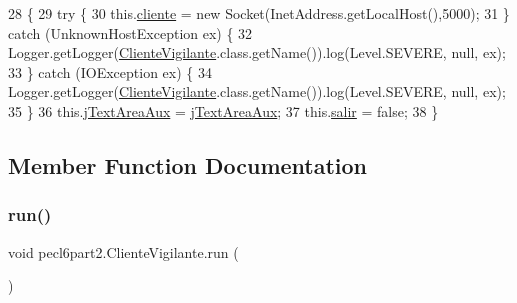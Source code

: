 \begin{DoxyCode}
28     \{
29         \textcolor{keywordflow}{try} \{
30             this.\mbox{\hyperlink{classpecl6part2_1_1_cliente_vigilante_a86ec03929e1c3324e42f83c4b49d0273}{cliente}} = \textcolor{keyword}{new} Socket(InetAddress.getLocalHost(),5000);
31         \} \textcolor{keywordflow}{catch} (UnknownHostException ex) \{
32             Logger.getLogger(\mbox{\hyperlink{classpecl6part2_1_1_cliente_vigilante_a2ba9f0dd667c95448bbbf3fe0cfccfcf}{ClienteVigilante}}.class.getName()).log(Level.SEVERE, null, ex);
33         \} \textcolor{keywordflow}{catch} (IOException ex) \{
34             Logger.getLogger(\mbox{\hyperlink{classpecl6part2_1_1_cliente_vigilante_a2ba9f0dd667c95448bbbf3fe0cfccfcf}{ClienteVigilante}}.class.getName()).log(Level.SEVERE, null, ex);
35         \}
36         this.\mbox{\hyperlink{classpecl6part2_1_1_cliente_vigilante_a1a8bbb57af057f85a3d16d5371bd747f}{jTextAreaAux}} = \mbox{\hyperlink{classpecl6part2_1_1_cliente_vigilante_a1a8bbb57af057f85a3d16d5371bd747f}{jTextAreaAux}};
37         this.\mbox{\hyperlink{classpecl6part2_1_1_cliente_vigilante_a79eb08097bb28efa5c33a168babe47e8}{salir}} = \textcolor{keyword}{false};
38     \}
\end{DoxyCode}


\subsection{Member Function Documentation}
\mbox{\label{classpecl6part2_1_1_cliente_vigilante_a38c9e8737a78b3a8cd85f85c0adfc08e}} 
\subsubsection{\texorpdfstring{run()}{run()}}
{\footnotesize\ttfamily void pecl6part2.\+Cliente\+Vigilante.\+run (\begin{DoxyParamCaption}{ }\end{DoxyParamCaption})\hspace{0.3cm}{\ttfamily [inline]}}


